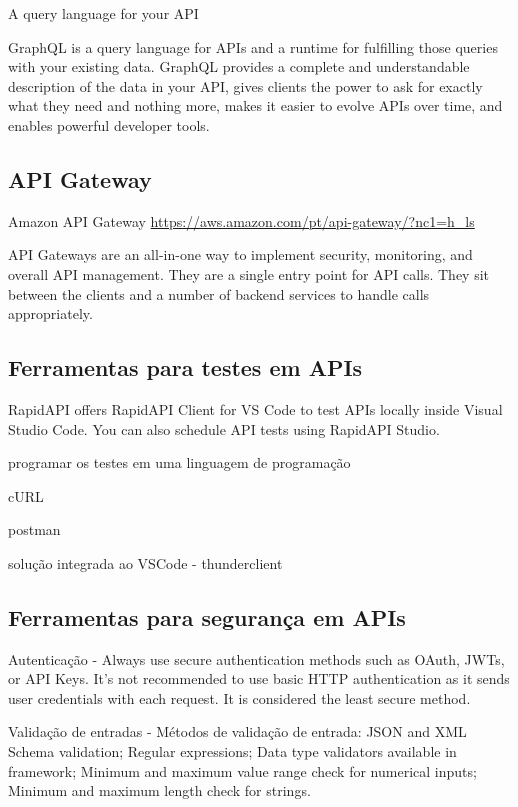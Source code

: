 A query language for your API

GraphQL is a query language for APIs and a runtime for fulfilling those queries with your existing data. GraphQL provides a complete and understandable description of the data in your API, gives clients the power to ask for exactly what they need and nothing more, makes it easier to evolve APIs over time, and enables powerful developer tools. \cite{GraphQL-site}

\subsection{API Gateway}

Amazon API Gateway \url{https://aws.amazon.com/pt/api-gateway/?nc1=h_ls}

API Gateways are an all-in-one way to implement security, monitoring, and overall API management. They are a single entry point for API calls. They sit between the clients and a number of backend services to handle calls appropriately.

\subsection{Ferramentas para testes em APIs}\label{ferramentas-testes-apis}

RapidAPI offers RapidAPI Client for VS Code to test APIs locally inside Visual Studio Code. You can also schedule API tests using RapidAPI Studio.

programar os testes em uma linguagem de programação

cURL

postman

solução integrada ao VSCode - thunderclient

\subsection{Ferramentas para segurança em APIs}

Autenticação - Always use secure authentication methods such as OAuth, JWTs, or API Keys. It's not recommended to use basic HTTP authentication as it sends user credentials with each request. It is considered the least secure method.

Validação de entradas - Métodos de validação de entrada: JSON and XML Schema validation; Regular expressions;  Data type validators available in framework; Minimum and maximum value range check for numerical inputs;  Minimum and maximum length check for strings.

